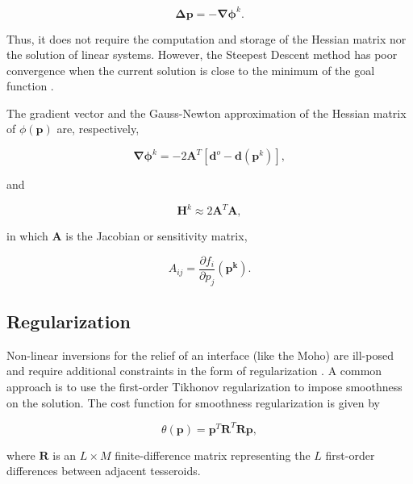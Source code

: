 \documentclass[extra,mreferee]{gji}
\begin{document}
\begin{equation}
    \mathbf{\Delta p} = -\mathbf{\nabla\phi}^k.
    \label{eq:steepest}
\end{equation}

\noindent
Thus, it does not require the computation and storage of the Hessian matrix
nor the solution of linear systems.
However, the Steepest Descent method has poor convergence when the
current solution is close to the minimum of the goal function
\citep{kelley1987}.

The gradient vector and the Gauss-Newton approximation of the Hessian matrix
of $\phi(\mathbf{p})$ are, respectively,

\begin{equation}
    \mathbf{\nabla\phi}^k = -2\mathbf{A}^T[\mathbf{d}^o - \mathbf{d}(\mathbf{p}^k)],
    \label{eq:gradient}
\end{equation}

\noindent
and

\begin{equation}
    \mathbf{H}^k \approx 2\mathbf{A}^T\mathbf{A},
    \label{eq:hessian}
\end{equation}

\noindent in which
$\mathbf{A}$ is the Jacobian or sensitivity matrix,

\begin{equation}
    A_{ij} = \dfrac{\partial f_i}{\partial p_j}(\mathbf{p^k}).
    \label{eq:jacobian}
\end{equation}



\subsection{Regularization}

Non-linear inversions for the relief of an interface (like the Moho)
are ill-posed and require additional constraints in the form of
regularization \citep{silva2001}.
A common approach is to use the first-order Tikhonov regularization to impose
smoothness on the solution.
The cost function for smoothness regularization is given by

\begin{equation}
    \theta(\mathbf{p}) = \mathbf{p}^T\mathbf{R}^T\mathbf{R}\mathbf{p},
\end{equation}

\noindent where $\mathbf{R}$ is an $L \times M$ finite-difference matrix
representing the $L$ first-order differences between adjacent tesseroids.
\end{document}
